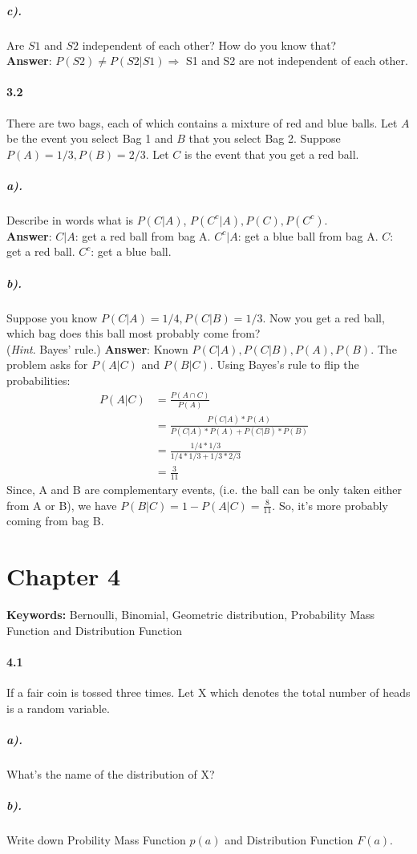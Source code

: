 \documentclass[11pt]{article} %
\begin{document}
\subparagraph*{c).} Are $S1$ and $S2$ independent of each other? How do you know that?\\
\textbf{Answer}: $P(S2) \neq P(S2|S1) \Rightarrow$ S1 and S2 are not independent of each other.

\paragraph*{3.2} There are two bags, each of which contains a mixture of red and blue balls. Let $A$ be the event you select Bag 1 and $B$ that you select Bag 2.
Suppose $P(A) = 1/3, P (B) = 2/3$. Let $C$ is the event that you get a red ball. 
\subparagraph*{a).} Describe in words what is $P(C|A)$, $P(C^c|A), P(C), P(C^c)$.\\
\textbf{Answer}: $C|A $: get a red ball from bag A. $C^c|A$: get a blue ball from bag A. $C$: get a red ball. $C^c$: get a blue ball.
\subparagraph*{b).} Suppose you know $P(C|A) = 1/4, P(C|B) = 1/3$. Now you get a red ball, which bag does this ball most probably come from?\\
(\textit{Hint}. Bayes' rule.)
\textbf{Answer}: Known $P(C|A), P(C|B), P(A), P(B)$. The problem asks for $P(A|C)$ and $P(B|C)$. Using Bayes's rule to flip the probabilities:
\begin{align*}
P(A|C) & = \frac{P(A\cap C)}{P(A)} & \\
& = \frac{P(C|A) *P(A)}{ P(C|A)*P(A) + P(C|B)*P(B)} & \\
& = \frac{1/4 * 1/3}{1/4 * 1/3 + 1/3 * 2/3}&  \\
& =\frac{3}{11} & 
\end{align*}
Since, A and B are complementary events, (i.e. the ball can be only taken either from A or B), we have $P(B|C) = 1 - P(A|C) = \frac{8}{11}$.
So, it's more probably coming from bag B.

\section{Chapter 4}
\textbf{Keywords: } Bernoulli, Binomial, Geometric distribution, Probability Mass Function and Distribution Function
\paragraph*{4.1} If a fair coin is tossed three times. Let X which denotes the total number of heads is a random variable. 
\subparagraph*{a).} What's the name of the distribution of X?
\subparagraph*{b).} Write down Probility Mass Function $p(a)$ and Distribution Function $F(a)$.
\end{document}
